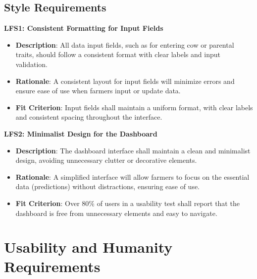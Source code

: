 \documentclass[12pt]{article}
\begin{document}
\subsection{Style Requirements}
\textbf{LFS1: Consistent Formatting for Input Fields}
\begin{itemize}
    \item \textbf{Description}: All data input fields, such as for entering 
    cow or parental traits, should follow a consistent format with clear labels 
    and input validation.
    \item \textbf{Rationale}: A consistent layout for input fields will 
    minimize errors and ensure ease of use when farmers input or update data.
    \item \textbf{Fit Criterion}: Input fields shall maintain a uniform 
    format, with clear labels and consistent spacing throughout the interface.
\end{itemize}
\textbf{LFS2: Minimalist Design for the Dashboard}
\begin{itemize}
    \item \textbf{Description}: The dashboard interface shall maintain a 
    clean and minimalist design, avoiding unnecessary clutter or decorative 
    elements.
    \item \textbf{Rationale}: A simplified interface will allow farmers to 
    focus on the essential data (predictions) without distractions, ensuring 
    ease of use.
    \item \textbf{Fit Criterion}: Over 80\% of users in a usability test 
    shall report that the dashboard is free from unnecessary elements and 
    easy to navigate.
\end{itemize}


\section{Usability and Humanity Requirements}
\end{document}
